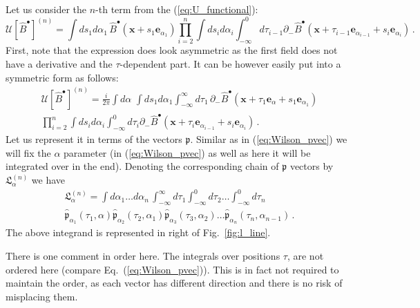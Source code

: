 \documentclass[english,american]{article}
\begin{document}
Let us consider the
$n$-th term from the (\ref{eq:U_functional}):
\begin{equation}
\mathcal{U}\left[\hat{B}^{\bullet}\right]^{\left(n\right)}=\int ds_{1}d\alpha_{1}\,\hat{B}^{\bullet}\left(\mathbf{x}+s_{1}\mathbf{e}_{\alpha_{1}}\right)\prod_{i=2}^{n}\int ds_{i}d\alpha_{i}\int_{-\infty}^{0}d\tau_{i-1}\partial_{-}\hat{B}^{\bullet}\left(\mathbf{x}+\tau_{i-1}\mathbf{e}_{\alpha_{i-1}}+s_{i}\mathbf{e}_{\alpha_{i}}\right)\,.\label{eq:U_functional-nth_1}
\end{equation}
First, note that the expression does look asymmetric as the first field does not
have a derivative and the $\tau$-dependent part. It can be however
easily put into a symmetric form as follows:
\begin{multline}
\mathcal{U}\left[\hat{B}^{\bullet}\right]^{\left(n\right)}=\frac{i}{2\pi}\int d\alpha\,\,\int ds_{1}d\alpha_{1}\int_{-\infty}^{\infty}d\tau_{1}\,\partial_{-}\hat{B}^{\bullet}\left(\mathbf{x}+\tau_{1}\mathbf{e}_{\alpha}+s_{1}\mathbf{e}_{\alpha_{1}}\right)\\
\prod_{i=2}^{n}\int ds_{i}d\alpha_{i}\int_{-\infty}^{0}d\tau_{i}\partial_{-}\hat{B}^{\bullet}
\left(\mathbf{x}+\tau_{i}\mathbf{e}_{\alpha_{i-1}}+s_{i}\mathbf{e}_{\alpha_{i}}\right)\,.\label{eq:U_functional-nth_1-1}
\end{multline}
Let us represent it in terms of the vectors $\mathfrak{p}$. Similar
as in (\ref{eq:Wilson_pvec}) we will fix the $\alpha$ parameter
(in (\ref{eq:Wilson_pvec}) as well as here it will be integrated
over in the end). Denoting the corresponding chain of $\mathfrak{p}$ vectors by  $\mathfrak{L}_{\alpha}^{\left(n\right)}$ we have 
\begin{multline}
\mathfrak{L}_{\alpha}^{\left(n\right)}=\int d\alpha_{1}\dots d\alpha_{n}\,\int_{-\infty}^{\infty}d\tau_{1}\int_{-\infty}^{0}d\tau_{2}\dots\int_{-\infty}^{0}d\tau_{n}\, \\ \hat{\mathfrak{p}}_{\alpha_{1}}\left(\tau_{1},\alpha\right)\hat{\mathfrak{p}}_{\alpha_{2}}\left(\tau_{2},\alpha_{1}\right)\hat{\mathfrak{p}}_{\alpha_{3}}\left(\tau_{3},\alpha_{2}\right)\dots\hat{\mathfrak{p}}_{\alpha_{n}}\left(\tau_{n},\alpha_{n-1}\right)\,.
\end{multline}
The above integrand is represented in right of Fig.~\ref{fig:l_line}. 

There is one comment in order here. The integrals over positions $\tau$,
are not ordered here (compare Eq.~(\ref{eq:Wilson_pvec})). This
is in fact not required to maintain the order, as each vector has
different direction and there is no risk of misplacing them. 
\end{document}
